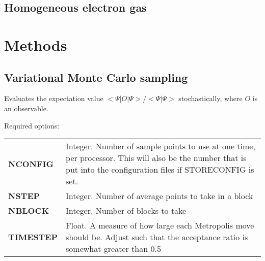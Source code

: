 \documentclass[12pt]{article}
\begin{document}
\newpage
\subsection{Homogeneous electron gas}

\newpage
\section{Methods}
\subsection{Variational Monte Carlo sampling}
Evaluates the expectation value $ <\Psi|O|\Psi>/<\Psi|\Psi>$
stochastically, where $O$ is an observable.

Required options: \\
\begin{tabular}{lp{12cm}}
{\bf NCONFIG} & Integer. Number of sample points to use at one time,
per processor.  This will also be the number that is put into the 
configuration files if STORECONFIG is set.\\
{\bf NSTEP} & Integer.  Number of average points to take in a block \\

{\bf NBLOCK} & Integer.  Number of blocks to take \\

{\bf TIMESTEP} & Float.  A measure of how large each Metropolis move
should be.  Adjust such that the acceptance ratio is somewhat greater than
0.5 \\
\end{tabular}
\end{document}
